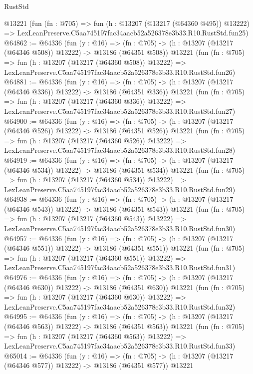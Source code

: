 \begin{lexlean}{RustStd}
\begin{coremodule}
    @13221
    (fun (fn : @705) =>
    fun (h : @13207 (@13217 (@64360 @495)) @13222) =>
    LexLeanPreserve.C5aa745197fac34aacb52a526378e3b33.R10.RustStd.fun25)
@64862 := @64336
    (fun (y : @16) =>
    (fn : @705) -> (h : @13207 (@13217 (@64346 @508)) @13222) -> @13186 (@64351 @508))
    @13221
    (fun (fn : @705) =>
    fun (h : @13207 (@13217 (@64360 @508)) @13222) =>
    LexLeanPreserve.C5aa745197fac34aacb52a526378e3b33.R10.RustStd.fun26)
@64881 := @64336
    (fun (y : @16) =>
    (fn : @705) -> (h : @13207 (@13217 (@64346 @336)) @13222) -> @13186 (@64351 @336))
    @13221
    (fun (fn : @705) =>
    fun (h : @13207 (@13217 (@64360 @336)) @13222) =>
    LexLeanPreserve.C5aa745197fac34aacb52a526378e3b33.R10.RustStd.fun27)
@64900 := @64336
    (fun (y : @16) =>
    (fn : @705) -> (h : @13207 (@13217 (@64346 @526)) @13222) -> @13186 (@64351 @526))
    @13221
    (fun (fn : @705) =>
    fun (h : @13207 (@13217 (@64360 @526)) @13222) =>
    LexLeanPreserve.C5aa745197fac34aacb52a526378e3b33.R10.RustStd.fun28)
@64919 := @64336
    (fun (y : @16) =>
    (fn : @705) -> (h : @13207 (@13217 (@64346 @534)) @13222) -> @13186 (@64351 @534))
    @13221
    (fun (fn : @705) =>
    fun (h : @13207 (@13217 (@64360 @534)) @13222) =>
    LexLeanPreserve.C5aa745197fac34aacb52a526378e3b33.R10.RustStd.fun29)
@64938 := @64336
    (fun (y : @16) =>
    (fn : @705) -> (h : @13207 (@13217 (@64346 @543)) @13222) -> @13186 (@64351 @543))
    @13221
    (fun (fn : @705) =>
    fun (h : @13207 (@13217 (@64360 @543)) @13222) =>
    LexLeanPreserve.C5aa745197fac34aacb52a526378e3b33.R10.RustStd.fun30)
@64957 := @64336
    (fun (y : @16) =>
    (fn : @705) -> (h : @13207 (@13217 (@64346 @551)) @13222) -> @13186 (@64351 @551))
    @13221
    (fun (fn : @705) =>
    fun (h : @13207 (@13217 (@64360 @551)) @13222) =>
    LexLeanPreserve.C5aa745197fac34aacb52a526378e3b33.R10.RustStd.fun31)
@64976 := @64336
    (fun (y : @16) =>
    (fn : @705) -> (h : @13207 (@13217 (@64346 @630)) @13222) -> @13186 (@64351 @630))
    @13221
    (fun (fn : @705) =>
    fun (h : @13207 (@13217 (@64360 @630)) @13222) =>
    LexLeanPreserve.C5aa745197fac34aacb52a526378e3b33.R10.RustStd.fun32)
@64995 := @64336
    (fun (y : @16) =>
    (fn : @705) -> (h : @13207 (@13217 (@64346 @563)) @13222) -> @13186 (@64351 @563))
    @13221
    (fun (fn : @705) =>
    fun (h : @13207 (@13217 (@64360 @563)) @13222) =>
    LexLeanPreserve.C5aa745197fac34aacb52a526378e3b33.R10.RustStd.fun33)
@65014 := @64336
    (fun (y : @16) =>
    (fn : @705) -> (h : @13207 (@13217 (@64346 @577)) @13222) -> @13186 (@64351 @577))
    @13221

\end{coremodule}
\end{lexlean}

